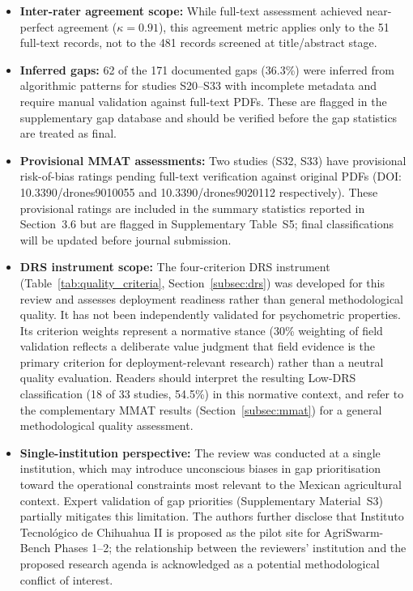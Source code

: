 \documentclass[review,3p,times]{elsarticle}
\begin{document}
\begin{itemize}
{\begin{itemize}
  \item \textbf{Inter-rater agreement scope:} While full-text assessment achieved 
near-perfect agreement ($\kappa=0.91$), this agreement metric applies only to the 
51 full-text records, not to the 481 records screened at title/abstract stage.
  \item \textbf{Inferred gaps:} 62 of the 171 documented gaps (36.3\%) were inferred from algorithmic patterns for studies S20--S33 with incomplete metadata and require manual validation against full-text PDFs. These are flagged in the supplementary gap database and should be verified before the gap statistics are treated as final.
  \item \textbf{Provisional MMAT assessments:} Two studies (S32, S33) have provisional risk-of-bias ratings pending full-text verification against original PDFs (DOI: 10.3390/drones9010055 and 10.3390/drones9020112 respectively). These provisional ratings are included in the summary statistics reported in Section~3.6 but are flagged in Supplementary Table~S5; final classifications will be updated before journal submission.
  \item \textbf{DRS instrument scope:} The four-criterion DRS instrument (Table~\ref{tab:quality_criteria}, Section~\ref{subsec:drs}) was developed for this review and assesses deployment readiness rather than general methodological quality. It has not been independently validated for psychometric properties. Its criterion weights represent a normative stance (30\% weighting of field validation reflects a deliberate value judgment that field evidence is the primary criterion for deployment-relevant research) rather than a neutral quality evaluation. Readers should interpret the resulting Low-DRS classification (18 of 33 studies, 54.5\%) in this normative context, and refer to the complementary MMAT results (Section~\ref{subsec:mmat}) for a general methodological quality assessment.
  \item \textbf{Single-institution perspective:} The review was conducted at a single institution, which may introduce unconscious biases in gap prioritisation toward the operational constraints most relevant to the Mexican agricultural context. Expert validation of gap priorities (Supplementary Material~S3) partially mitigates this limitation. The authors further disclose that Instituto Tecnológico de Chihuahua II is proposed as the pilot site for AgriSwarm-Bench Phases 1--2; the relationship between the reviewers' institution and the proposed research agenda is acknowledged as a potential methodological conflict of interest.
\end{itemize}

}
\end{itemize}
\end{document}
